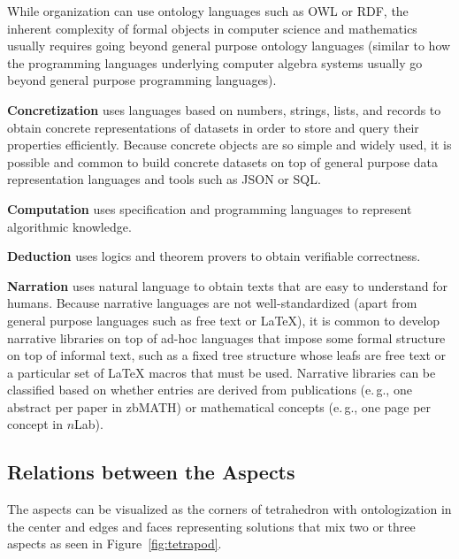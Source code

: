 While organization can use ontology languages such as OWL or RDF, the inherent complexity of formal objects in computer science and mathematics usually requires going beyond general purpose ontology languages (similar to how the programming languages underlying computer algebra systems usually go beyond general purpose programming languages).

\textbf{Concretization} uses languages based on numbers, strings, lists, and records to obtain concrete representations of datasets in order to store and query their properties efficiently.
Because concrete objects are so simple and widely used, it is possible and common to build concrete datasets on top of general purpose data representation languages and tools such as JSON or SQL.

\textbf{Computation} uses specification and programming languages to represent algorithmic knowledge.

\textbf{Deduction} uses logics and theorem provers  to obtain verifiable correctness.

\textbf{Narration} uses natural language to obtain texts that are easy to understand for humans.
Because narrative languages are not well-standardized (apart from general purpose languages such as free text or \LaTeX), it is common to develop narrative libraries on top of ad-hoc languages that impose some formal structure on top of informal text, such as a fixed tree structure whose leafs are free text or a particular set of {\LaTeX} macros that must be used.
Narrative libraries can be classified based on whether entries are derived from publications (e.\,g., one abstract per paper in zbMATH) or mathematical concepts (e.\,g., one page per concept in $n$Lab).



\subsection{Relations between the Aspects}

The aspects can be visualized as the corners of tetrahedron with ontologization in the center and edges and faces representing solutions that mix two or three aspects as seen in Figure~\ref{fig:tetrapod}.

